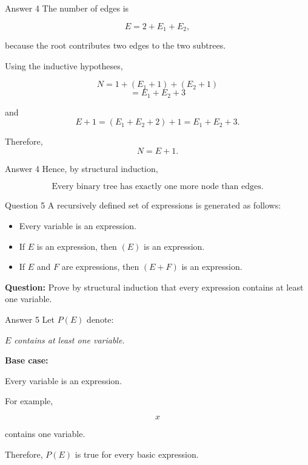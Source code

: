 \begin{frame}{Answer 4}
The number of edges is

$$
E=2+E_1+E_2,
$$

because the root contributes two edges to the two subtrees.

Using the inductive hypotheses,

$$
N
=
1+(E_1+1)+(E_2+1)
$$
$$
=E_1+E_2+3
$$

and
$$
E+1
=
(E_1+E_2+2)+1
=
E_1+E_2+3.
$$

Therefore,
$$
N=E+1.
$$

\end{frame}

\begin{frame}{Answer 4}
Hence, by structural induction,

$$
\boxed{
\text{Every binary tree has exactly one more node than edges.}
}
$$

\end{frame}


\begin{frame}{Question 5}
A recursively defined set of expressions is generated as follows:

\begin{itemize}
\item Every variable is an expression.
\item If $E$ is an expression, then $(E)$ is an expression.
\item If $E$ and $F$ are expressions, then $(E+F)$ is an expression.
\end{itemize}

\textbf{Question:} Prove by structural induction that every expression contains at least one variable.
\end{frame}

\begin{frame}{Answer 5}
Let $P(E)$ denote:

\textit{$E$ contains at least one variable.}

\textbf{Base case:}

Every variable is an expression.

For example,

$$
x
$$

contains one variable.

Therefore, $P(E)$ is true for every basic expression.
\end{frame}

